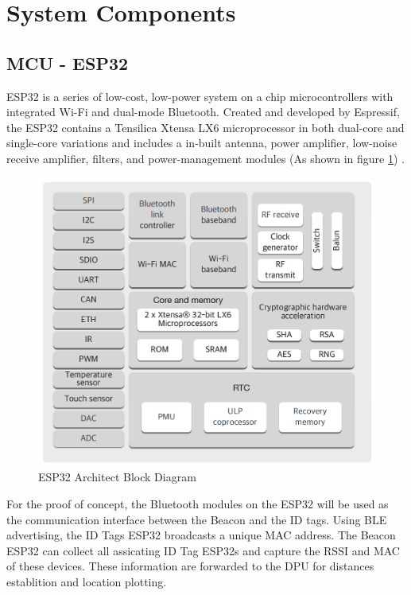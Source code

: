

\setcounter{section}{2}
\section{System Components}
\bigskip

\subsection{MCU - ESP32}
\medskip
ESP32 is a series of low-cost, low-power system on a chip microcontrollers with integrated Wi-Fi and dual-mode Bluetooth. Created and developed by Espressif, the ESP32 contains a Tensilica Xtensa LX6 microprocessor in both dual-core and single-core variations and includes a in-built antenna, power amplifier, low-noise receive amplifier, filters, and power-management modules (As shown in figure \ref{esp_core}) \cite{R3-1-1}. 

\medskip
\begin{figure}[H]
\centering
    \includegraphics[scale=0.4]{./images/esp_core.png}
    \caption{ESP32 Architect Block Diagram}
    \label{esp_core}
\end{figure}

For the proof of concept, the Bluetooth modules on the ESP32 will be used as the communication interface between the Beacon and the ID tags. Using BLE advertising, the ID Tags ESP32 broadcasts a unique MAC address. The Beacon ESP32 can collect all assicating ID Tag ESP32s and capture the RSSI and MAC of these devices. These information are forwarded to the DPU for distances establition and location plotting.

